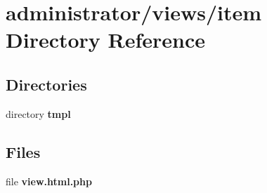 \section{administrator/views/item Directory Reference}
\label{dir_e72014eb6ac5c3b3d3d0e018b58af093}
\subsection*{Directories}
\begin{DoxyCompactItemize}
\item 
directory \textbf{ tmpl}
\end{DoxyCompactItemize}
\subsection*{Files}
\begin{DoxyCompactItemize}
\item 
file \textbf{ view.\+html.\+php}
\end{DoxyCompactItemize}
